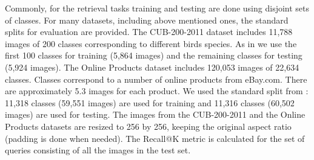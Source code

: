 Commonly, for the retrieval tasks training and testing are done using disjoint sets of classes. For many datasets, including above mentioned ones, the standard splits for evaluation are provided.
The CUB-200-2011 dataset includes 11,788 images of 200 classes corresponding to different birds species. As in \citep{Song16} we use the first 100 classes for training
(5,864 images) and the remaining classes for testing
(5,924 images).
The Online Products dataset includes 120,053 images of 22,634 classes. Classes correspond to a number of online products from eBay.com. There are approximately 5.3 images for each product. We used the standard split from \citep{Song16}: 11,318 classes (59,551 images)  are used for training and 11,316 classes (60,502 images) are used for testing.
The images from the CUB-200-2011 and the Online Products datasets are resized to 256 by 256, keeping the original aspect ratio (padding is done when needed). The Recall@K metric is calculated for the set of queries consisting of all the images in the test set.

